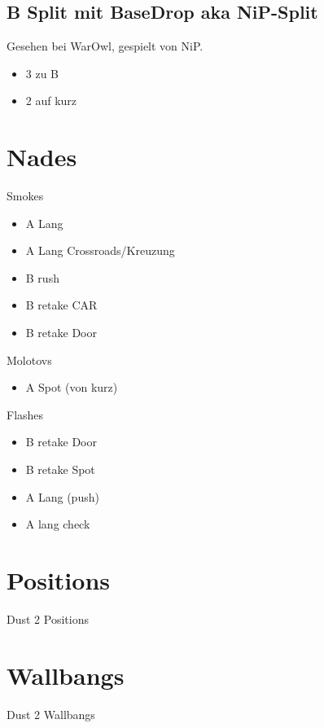 \subsection{B Split mit BaseDrop aka NiP-Split}
\label{subsect:dust2_nip_split}
Gesehen bei WarOwl, gespielt von NiP.

\begin{itemize}
\item 3 zu B
\item 2 auf kurz
\end{itemize}


\section{Nades}
\label{sect:dust2_nades}
Smokes
\begin{itemize}
\item A Lang
\item A Lang Crossroads/Kreuzung
\item B rush
\item B retake CAR
\item B retake Door
\end{itemize}

Molotovs
\begin{itemize}
\item A Spot (von kurz)
\end{itemize}

Flashes
\begin{itemize}
\item B retake Door
\item B retake Spot
\item A Lang (push)
\item A lang check
\end{itemize}

\section{Positions}
\label{sect:dust2_positions}
Dust 2 Positions

\section{Wallbangs}
\label{sect:dust2_wallbangs}
Dust 2 Wallbangs
